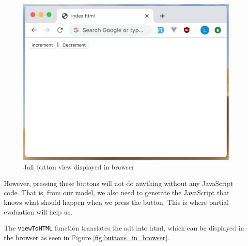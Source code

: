 \begin{figure}
    \centering
    \includegraphics[width=\textwidth]{images/jali-button-in-browser.png}
    \caption{Jali button view displayed in browser}
    \label{fig:jali-buttons-in-browser}
\end{figure}



However, pressing these buttons will not do anything without any JavaScript code. That is, from our model, we also need to generate the JavaScript that knows what should happen when we press the button. This is where partial evaluation will help us. 



% 

The \texttt{viewToHTML} function translates the \gls{adt} into \gls{html}, which can be displayed in the browser as seen in Figure \ref{fig:buttons_in_browser}. 

